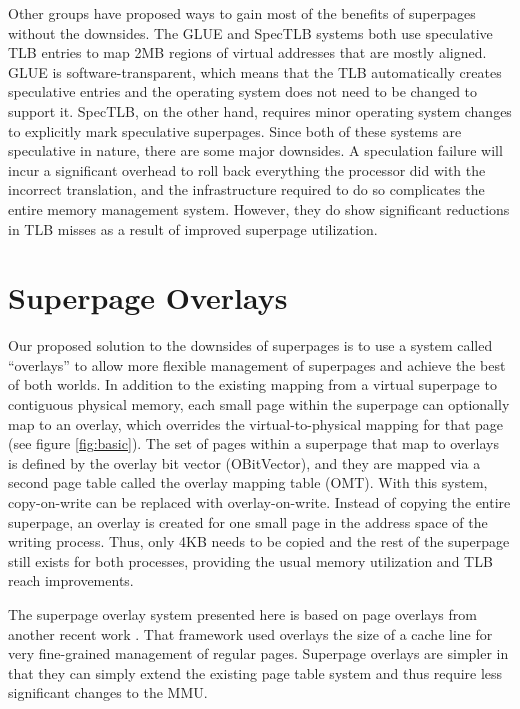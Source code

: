 Other groups have proposed ways to gain most of the benefits of superpages without the downsides. The GLUE \cite{Pham} and SpecTLB \cite{Barr} systems both use speculative TLB entries to map 2MB regions of virtual addresses that are mostly aligned. GLUE is software-transparent, which means that the TLB automatically creates speculative entries and the operating system does not need to be changed to support it. SpecTLB, on the other hand, requires minor operating system changes to explicitly mark speculative superpages. Since both of these systems are speculative in nature, there are some major downsides. A speculation failure will incur a significant overhead to roll back everything the processor did with the incorrect translation, and the infrastructure required to do so complicates the entire memory management system. However, they do show significant reductions in TLB misses as a result of improved superpage utilization.

\section{Superpage Overlays}

Our proposed solution to the downsides of superpages is to use a system called ``overlays'' to allow more flexible management of superpages and achieve the best of both worlds. In addition to the existing mapping from a virtual superpage to contiguous physical memory, each small page within the superpage can optionally map to an overlay, which overrides the virtual-to-physical mapping for that page (see figure \ref{fig:basic}). The set of pages within a superpage that map to overlays is defined by the overlay bit vector (OBitVector), and they are mapped via a second page table called the overlay mapping table (OMT). With this system, copy-on-write can be replaced with overlay-on-write. Instead of copying the entire superpage, an overlay is created for one small page in the address space of the writing process. Thus, only 4KB needs to be copied and the rest of the superpage still exists for both processes, providing the usual memory utilization and TLB reach improvements.

The superpage overlay system presented here is based on page overlays from another recent work \cite{Seshadri}. That framework used overlays the size of a cache line for very fine-grained management of regular pages. Superpage overlays are simpler in that they can simply extend the existing page table system and thus require less significant changes to the MMU.


